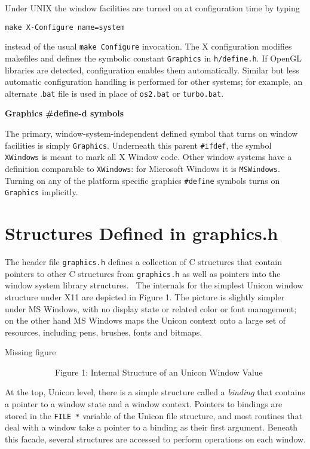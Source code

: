 Under UNIX the window facilities are turned on at configuration time by typing

\texttt{make X-Configure name=system}

\noindent instead of the usual \texttt{make Configure} invocation. The
X configuration modifies makefiles and defines the symbolic constant
\texttt{Graphics} in \texttt{h/define.h}. If OpenGL libraries are
detected, configuration enables them automatically. Similar but less
automatic configuration handling is performed for other systems; for
example, an alternate .\texttt{bat} file is used in place of
\texttt{os2.bat} or \texttt{turbo.bat}.

{\sffamily
\textbf{Graphics \#define{}-d symbols}}

The primary, window-system-independent defined symbol that turns on
window facilities is simply \texttt{Graphics}.  Underneath this parent
\texttt{\#ifdef}, the symbol \texttt{XWindows} is meant to mark all X
Window code. Other window systems have a definition comparable to
\texttt{XWindows}: for Microsoft Windows it is \texttt{MSWindows}.
Turning on any of the platform specific graphics
\texttt{\#define} symbols turns on \texttt{Graphics} implicitly.

\section{Structures Defined in graphics.h}

The header file \texttt{graphics.h} defines a collection of C
structures that contain pointers to other C structures from
\texttt{graphics.h} as well as pointers into the window system library
structures. \ The internals for the simplest Unicon window structure
under X11 are depicted in Figure 1. The picture is slightly simpler
under MS Windows, with no display state or related color or font
management; on the other hand MS Windows maps the Unicon context onto
a large set of resources, including pens, brushes, fonts and bitmaps.


\bigskip


\bigskip
\begin{center}{\color{red} Missing figure}\end{center}


\bigskip


\ \  \ \ \ \ \ \ \ \ \ \ Figure 1: Internal Structure of an Unicon Window Value


At the top, Unicon level, there is a simple structure called a
\textit{binding} that contains a pointer to a window state and a
window context. Pointers to bindings are stored in the \texttt{FILE *}
variable of the Unicon file structure, and most routines that deal
with a window take a pointer to a binding as their first
argument. Beneath this facade, several structures are accessed to
perform operations on each window.

